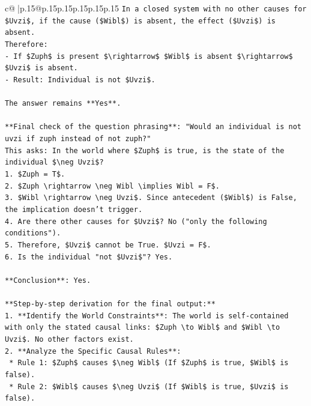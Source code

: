 \documentclass{article}
\begin{document}
{\begin{supertabular}{c@{$\;$}|p{.15\linewidth}@{}p{.15\linewidth}p{.15\linewidth}p{.15\linewidth}p{.15\linewidth}p{.15\linewidth}}
{{{\texttt{In a closed system with no other causes for \$Uvzi\$, if the cause (\$Wibl\$) is absent, the effect (\$Uvzi\$) is absent.} \\
\texttt{Therefore:} \\
\texttt{{-} If \$Zuph\$ is present \$\textbackslash{}rightarrow\$ \$Wibl\$ is absent \$\textbackslash{}rightarrow\$ \$Uvzi\$ is absent.} \\
\texttt{{-} Result: Individual is not \$Uvzi\$.} \\
\\ 
\texttt{The answer remains **Yes**.} \\
\\ 
\texttt{**Final check of the question phrasing**: "Would an individual is not uvzi if zuph instead of not zuph?"} \\
\texttt{This asks: In the world where \$Zuph\$ is true, is the state of the individual \$\textbackslash{}neg Uvzi\$?} \\
\texttt{1. \$Zuph = T\$.} \\
\texttt{2. \$Zuph \textbackslash{}rightarrow \textbackslash{}neg Wibl \textbackslash{}implies Wibl = F\$.} \\
\texttt{3. \$Wibl \textbackslash{}rightarrow \textbackslash{}neg Uvzi\$. Since antecedent (\$Wibl\$) is False, the implication doesn't trigger.} \\
\texttt{4. Are there other causes for \$Uvzi\$? No ("only the following conditions").} \\
\texttt{5. Therefore, \$Uvzi\$ cannot be True. \$Uvzi = F\$.} \\
\texttt{6. Is the individual "not \$Uvzi\$"? Yes.} \\
\\ 
\texttt{**Conclusion**: Yes.} \\
\\ 
\texttt{**Step{-}by{-}step derivation for the final output:**} \\
\texttt{1.  **Identify the World Constraints**: The world is self{-}contained with only the stated causal links: \$Zuph \textbackslash{}to Wibl\$ and \$Wibl \textbackslash{}to Uvzi\$. No other factors exist.} \\
\texttt{2.  **Analyze the Specific Causal Rules**:} \\
\texttt{    *   Rule 1: \$Zuph\$ causes \$\textbackslash{}neg Wibl\$ (If \$Zuph\$ is true, \$Wibl\$ is false).} \\
\texttt{    *   Rule 2: \$Wibl\$ causes \$\textbackslash{}neg Uvzi\$ (If \$Wibl\$ is true, \$Uvzi\$ is false).} \\
}}}
\end{supertabular}}
\end{document}
